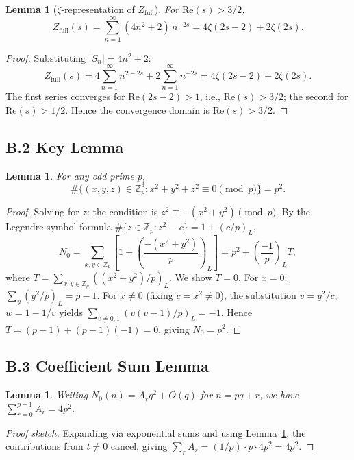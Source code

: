 \documentclass[12pt]{article}
\newtheorem{lemma}[theorem]{Lemma}
\begin{document}
\begin{lemma}[$\zeta$-representation of $Z_{\mathrm{full}}$]
\label{lem:zfull}
  For $\mathrm{Re}(s) > 3/2$,
  \[
    Z_{\mathrm{full}}(s) 
    = \sum_{n=1}^{\infty}(4n^2+2)\,n^{-2s}
    = 4\zeta(2s-2) + 2\zeta(2s).
  \]
\end{lemma}

\begin{proof}
  Substituting $|S_n|=4n^2+2$:
  \[
    Z_{\mathrm{full}}(s) 
    = 4\sum_{n=1}^{\infty}n^{2-2s} + 2\sum_{n=1}^{\infty}n^{-2s}
    = 4\zeta(2s-2)+2\zeta(2s).
  \]
  The first series converges for $\mathrm{Re}(2s-2)>1$, i.e., 
  $\mathrm{Re}(s)>3/2$; the second for $\mathrm{Re}(s)>1/2$.
  Hence the convergence domain is $\mathrm{Re}(s)>3/2$.
\end{proof}

\subsection*{B.2 Key Lemma}

\begin{lemma}
\label{lem:key}
  For any odd prime $p$,
  \[
    \#\{(x,y,z)\in\mathbb{Z}_p^3 : x^2+y^2+z^2\equiv 0\pmod{p}\} = p^2.
  \]
\end{lemma}

\begin{proof}
  Solving for $z$: the condition is $z^2\equiv-(x^2+y^2)\pmod{p}$.
  By the Legendre symbol formula $\#\{z\in\mathbb{Z}_p:z^2\equiv c\}=1+(c/p)_L$,
  \[
    N_0 = \sum_{x,y\in\mathbb{Z}_p}\!\!\left[1+\left(\frac{-(x^2+y^2)}{p}\right)_{\!L}\right]
        = p^2 + \left(\frac{-1}{p}\right)_{\!L} T,
  \]
  where $T=\sum_{x,y\in\mathbb{Z}_p}((x^2+y^2)/p)_L$.
  We show $T=0$. For $x=0$: $\sum_y(y^2/p)_L=p-1$.
  For $x\neq 0$ (fixing $c=x^2\neq 0$), the substitution
  $v=y^2/c$, $w=1-1/v$ yields $\sum_{v\neq 0,1}(v(v-1)/p)_L=-1$.
  Hence $T=(p-1)+(p-1)(-1)=0$, giving $N_0=p^2$.
\end{proof}

\subsection*{B.3 Coefficient Sum Lemma}

\begin{lemma}
\label{lem:coeff}
  Writing $N_0(n)=A_r q^2+O(q)$ for $n=pq+r$,
  we have $\sum_{r=0}^{p-1}A_r = 4p^2$.
\end{lemma}

\begin{proof}[Proof sketch]
  Expanding via exponential sums and using Lemma~\ref{lem:key}, 
  the contributions from $t\neq 0$ cancel, giving 
  $\sum_r A_r=(1/p)\cdot p\cdot 4p^2=4p^2$.
\end{proof}
\end{document}
